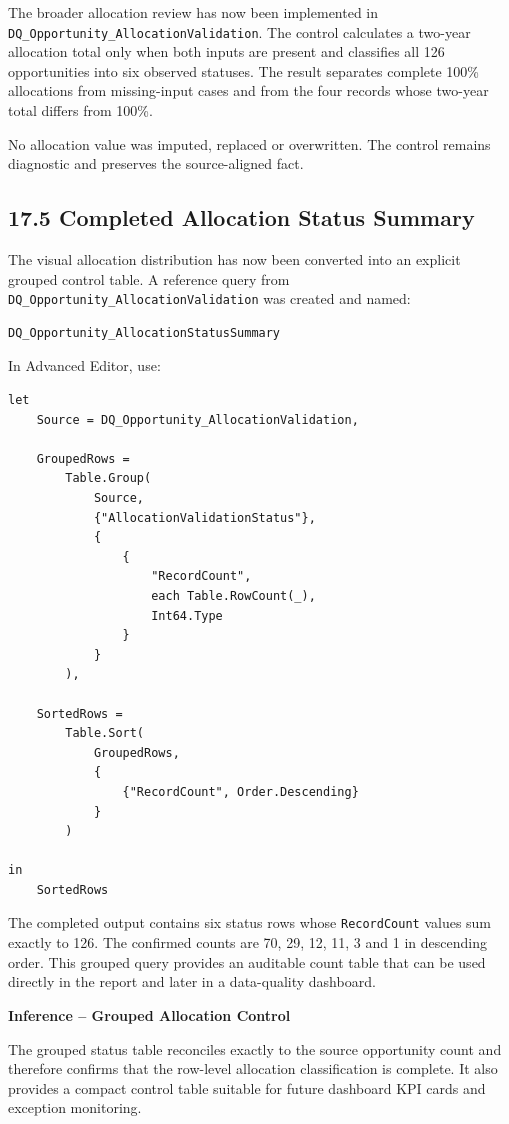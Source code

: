 \documentclass[11pt,a4paper]{article}
\begin{document}
The broader allocation review has now been implemented in
\texttt{DQ\_Opportunity\_AllocationValidation}. The control calculates a
two-year allocation total only when both inputs are present and classifies all
126 opportunities into six observed statuses. The result separates complete
100\% allocations from missing-input cases and from the four records whose
two-year total differs from 100\%.

No allocation value was imputed, replaced or overwritten. The control remains
diagnostic and preserves the source-aligned fact.

\subsection{17.5 Completed Allocation Status Summary}

The visual allocation distribution has now been converted into an explicit
grouped control table. A reference query from
\texttt{DQ\_Opportunity\_AllocationValidation} was created and named:

\begin{lstlisting}[style=powerquery]
DQ_Opportunity_AllocationStatusSummary
\end{lstlisting}

In Advanced Editor, use:

\begin{lstlisting}[style=powerquery]
let
    Source = DQ_Opportunity_AllocationValidation,

    GroupedRows =
        Table.Group(
            Source,
            {"AllocationValidationStatus"},
            {
                {
                    "RecordCount",
                    each Table.RowCount(_),
                    Int64.Type
                }
            }
        ),

    SortedRows =
        Table.Sort(
            GroupedRows,
            {
                {"RecordCount", Order.Descending}
            }
        )

in
    SortedRows
\end{lstlisting}

The completed output contains six status rows whose \texttt{RecordCount} values
sum exactly to 126. The confirmed counts are 70, 29, 12, 11, 3 and 1 in
descending order. This grouped query provides an auditable count table that can
be used directly in the report and later in a data-quality dashboard.

\begin{inferencebox}

\textbf{Inference -- Grouped Allocation Control}

The grouped status table reconciles exactly to the source opportunity count and
therefore confirms that the row-level allocation classification is complete.
It also provides a compact control table suitable for future dashboard KPI
cards and exception monitoring.

\end{inferencebox}
\end{document}
